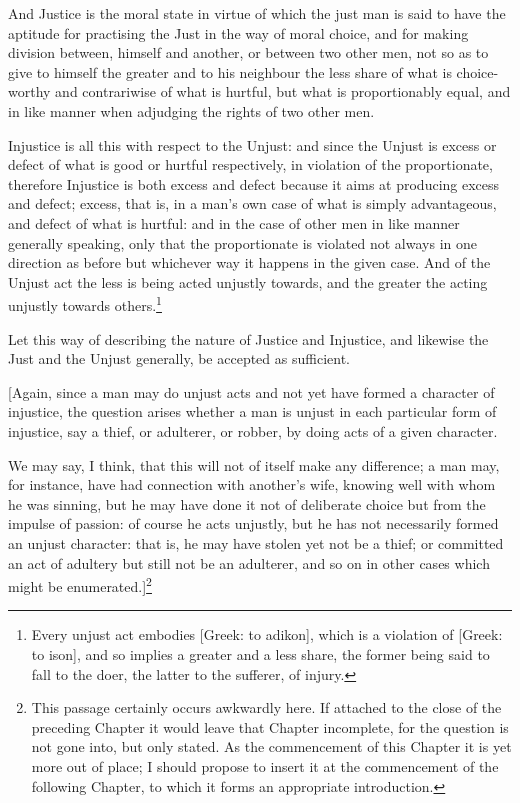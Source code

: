 And Justice is the moral state in virtue of which the just man is said to have
the aptitude for practising the Just in the way of moral choice, and for making
division between, himself and another, or between two other men, not so as to
give to himself the greater and to his neighbour the less share of what is
choice-worthy and contrariwise of what is hurtful, but what is proportionably
equal, and in like manner when adjudging the rights of two other men.

Injustice is all this with respect to the Unjust: and since the Unjust is
excess or defect of what is good or hurtful respectively, in violation of the
proportionate, therefore Injustice is both excess and defect because it aims at
producing excess and defect; excess, that is, in a man’s own case of what
is simply advantageous, and defect of what is hurtful: and in the case of other
men in like manner generally speaking, only that the proportionate is violated
not always in one direction as before but whichever way it happens in the given
case. And of the Unjust act the less is being acted unjustly towards, and the
greater the acting unjustly towards others.\footnote{Every unjust act embodies [Greek: to adikon], which is a violation of [Greek:
to ison], and so implies a greater and a less share, the former being said to
fall to the doer, the latter to the sufferer, of injury.}

Let this way of describing the nature of Justice and Injustice, and likewise
the Just and the Unjust generally, be accepted as sufficient.


[Again, since a man may do unjust acts and not yet have formed a character of
injustice, the question arises whether a man is unjust in each particular form
of injustice, say a thief, or adulterer, or robber, by doing acts of a given
character.

We may say, I think, that this will not of itself make any difference; a man
may, for instance, have had connection with another’s wife, knowing well
with whom he was sinning, but he may have done it not of deliberate choice but
from the impulse of passion: of course he acts unjustly, but he has not
necessarily formed an unjust character: that is, he may have stolen yet not be
a thief; or committed an act of adultery but still not be an adulterer, and so
on in other cases which might be enumerated.]\footnote{This passage certainly occurs awkwardly here. If attached to the close
of the preceding Chapter it would leave that Chapter incomplete, for
the question is not gone into, but only stated. As the commencement of
this Chapter it is yet more out of place; I should propose to insert it
at the commencement of the following Chapter, to which it forms an
appropriate introduction.}

